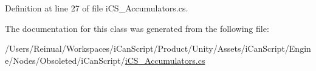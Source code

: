 Definition at line 27 of file i\+C\+S\+\_\+\+Accumulators.\+cs.



The documentation for this class was generated from the following file\+:\begin{DoxyCompactItemize}
\item 
/\+Users/\+Reinual/\+Workspaces/i\+Can\+Script/\+Product/\+Unity/\+Assets/i\+Can\+Script/\+Engine/\+Nodes/\+Obsoleted/i\+Can\+Script/\hyperlink{i_c_s___accumulators_8cs}{i\+C\+S\+\_\+\+Accumulators.\+cs}\end{DoxyCompactItemize}

